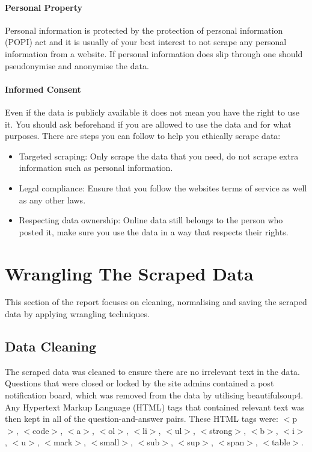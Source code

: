 \documentclass[10pt]{article}
\begin{document}
\paragraph{Personal Property}
Personal information is protected by the protection of personal information (POPI) act and it is usually of
your best interest to not scrape any personal information from a website. If personal information does slip
through one should pseudonymise and anonymise the data. 

\paragraph{Informed Consent}
Even if the data is publicly available it does not mean you have the right to use it. You should ask
beforehand if you are allowed to use the data and for what purposes.
There are steps you can follow to help you ethically scrape data:
\begin{itemize}
    \item Targeted scraping: Only scrape the data that you need, do not scrape extra information such as personal information.
    \item Legal compliance: Ensure that you follow the websites terms of service as well as any other laws.
    \item Respecting data ownership: Online data still belongs to the person who posted it, make sure you use the data in a way that respects their rights.
\end{itemize}

\section{Wrangling The Scraped Data}

This section of the report focuses on cleaning, normalising and saving the scraped data
by applying wrangling techniques.

\subsection{Data Cleaning}

The scraped data was cleaned to ensure there are no irrelevant text in the data. Questions that
were closed or locked by the site admins contained a post notification board, which was removed
from the data by utilising beautifulsoup4. Any Hypertext Markup Language (HTML) tags that contained relevant text was then kept
in all of the question-and-answer pairs. These HTML tags were: $<$p$>$, $<$code$>$, $<$a$>$, $<$ol$>$, $<$li$>$, $<$ul$>$,
$<$strong$>$, $<$b$>$, $<$i$>$, $<$u$>$, $<$mark$>$, $<$small$>$, $<$sub$>$, $<$sup$>$, $<$span$>$, $<$table$>$.
\end{document}
